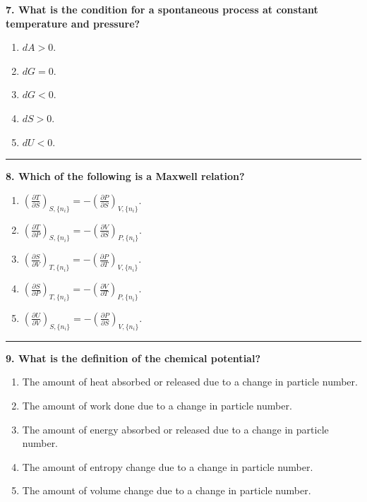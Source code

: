 \documentclass[
  9pt,
]{extbook}
\providecommand{\tightlist}{%
  \setlength{\itemsep}{0pt}\setlength{\parskip}{0pt}}
\theoremstyle{definition}
\theoremstyle{definition}
\theoremstyle{definition}
\theoremstyle{definition}
\theoremstyle{remark}
\begin{document}
\textbf{7. What is the condition for a spontaneous process at constant temperature and pressure?}

\begin{enumerate}
\def\labelenumi{\alph{enumi}.}
\tightlist
\item
  \(dA > 0\).
\item
  \(dG = 0\).
\item
  \(dG < 0\).
\item
  \(dS > 0\).
\item
  \(dU < 0\).
\end{enumerate}

\begin{center}\rule{0.5\linewidth}{0.5pt}\end{center}

\textbf{8. Which of the following is a Maxwell relation?}

\begin{enumerate}
\def\labelenumi{\alph{enumi}.}
\tightlist
\item
  \(\left(\frac{\partial T}{\partial S}\right)_{S,\{n_i\}} = -\left(\frac{\partial P}{\partial S}\right)_{V,\{n_i\}}\).
\item
  \(\left(\frac{\partial T}{\partial P}\right)_{S,\{n_i\}} = -\left(\frac{\partial V}{\partial S}\right)_{P,\{n_i\}}\).
\item
  \(\left(\frac{\partial S}{\partial V}\right)_{T,\{n_i\}} = -\left(\frac{\partial P}{\partial T}\right)_{V,\{n_i\}}\).
\item
  \(\left(\frac{\partial S}{\partial P}\right)_{T,\{n_i\}} = -\left(\frac{\partial V}{\partial T}\right)_{P,\{n_i\}}\).
\item
  \(\left(\frac{\partial U}{\partial V}\right)_{S,\{n_i\}} = -\left(\frac{\partial P}{\partial S}\right)_{V,\{n_i\}}\).
\end{enumerate}

\begin{center}\rule{0.5\linewidth}{0.5pt}\end{center}

\textbf{9. What is the definition of the chemical potential?}

\begin{enumerate}
\def\labelenumi{\alph{enumi}.}
\tightlist
\item
  The amount of heat absorbed or released due to a change in particle number.
\item
  The amount of work done due to a change in particle number.
\item
  The amount of energy absorbed or released due to a change in particle number.
\item
  The amount of entropy change due to a change in particle number.
\item
  The amount of volume change due to a change in particle number.
\end{enumerate}
\end{document}
